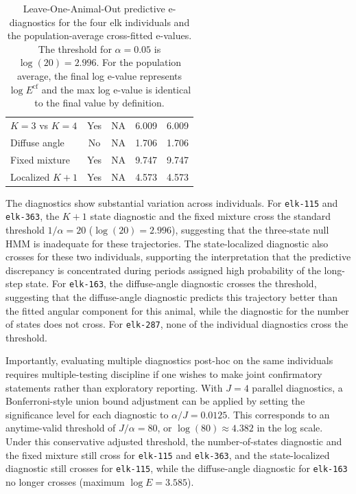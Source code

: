 \documentclass[pdflatex,sn-basic]{sn-jnl}
\theoremstyle{thmstyleone}
\theoremstyle{thmstyletwo}
\theoremstyle{thmstylethree}
\newcommand{\1}{\mathbf 1}
\begin{document}
\begin{table}[t]
\begin{tabular}{lcccc}
\quad $K=3$ vs $K=4$ & Yes & NA & 6.009 & 6.009 \\
\quad Diffuse angle & No & NA & 1.706 & 1.706 \\
\quad Fixed mixture & Yes & NA & 9.747 & 9.747 \\
\quad Localized $K+1$ & Yes & NA & 4.573 & 4.573 \\
\bottomrule
\end{tabular}
\caption{Leave-One-Animal-Out predictive e-diagnostics for the four elk individuals and the population-average cross-fitted e-values. The threshold for $\alpha=0.05$ is $\log(20) = 2.996$. For the population average, the final log e-value represents $\log E^{\text{cf}}$ and the max log e-value is identical to the final value by definition.}
\label{tab:elk_diagnostics}
\end{table}

The diagnostics show substantial variation across individuals. For \texttt{elk-115} and \texttt{elk-363}, the $K+1$ state diagnostic and the fixed mixture cross the standard threshold $1/\alpha = 20$ ($\log(20) = 2.996$), suggesting that the three-state null HMM is inadequate for these trajectories. The state-localized diagnostic also crosses for these two individuals, supporting the interpretation that the predictive discrepancy is concentrated during periods assigned high probability of the long-step state. For \texttt{elk-163}, the diffuse-angle diagnostic crosses the threshold, suggesting that the diffuse-angle diagnostic predicts this trajectory better than the fitted angular component for this animal, while the diagnostic for the number of states does not cross. For \texttt{elk-287}, none of the individual diagnostics cross the threshold.

Importantly, evaluating multiple diagnostics post-hoc on the same individuals requires multiple-testing discipline if one wishes to make joint confirmatory statements rather than exploratory reporting. With $J = 4$ parallel diagnostics, a Bonferroni-style union bound adjustment can be applied by setting the significance level for each diagnostic to $\alpha/J = 0.0125$. This corresponds to an anytime-valid threshold of $J/\alpha = 80$, or $\log(80) \approx 4.382$ in the log scale. Under this conservative adjusted threshold, the number-of-states diagnostic and the fixed mixture still cross for \texttt{elk-115} and \texttt{elk-363}, and the state-localized diagnostic still crosses for \texttt{elk-115}, while the diffuse-angle diagnostic for \texttt{elk-163} no longer crosses (maximum $\log E = 3.585$).
\end{document}
